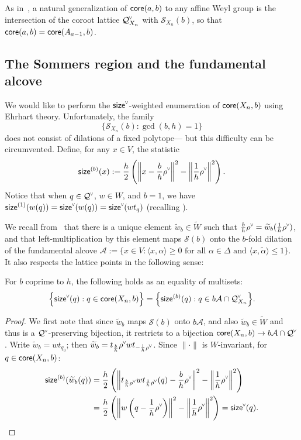 \documentclass[ALCO,published]{cedram}
\newcommand{\chk}[1]{#1^{\normalfont\smash{\scalebox{.5}[.5]{\rotatebox{90}{\textbf{\textless}}}}}}
\newcommand{\wa}{\widetilde{W}}
\newcommand{\Q}{\mathcal{Q}}
\newcommand{\ac}{\mathcal{A}}
\newcommand{\Sommers}{\mathcal{S}}
\newcommand{\core}{{\sf core}}
\newcommand{\waf}{\widetilde{w}}
\newcommand{\wf}{\waf_{\rat}}
\newcommand{\amax}{\tilde{\alpha}}
\newcommand{\size}{{\sf size}}
\newcommand{\sizeb}{\size^{(b)}}
\newcommand{\rat}{b}
\begin{document}
As in~, a natural generalization of $\core(a,b)$ to any affine Weyl group is the intersection of the coroot lattice $\chk{\Q}_{X_n}$ with $\Sommers_{X_n}(b)$, so that $\core(a,b) = \core(A_{a-1},b)$.


\subsection{The Sommers region and the fundamental alcove}

We would like to perform the $\chk{\size}$-weighted enumeration of $\core(X_n,b)$ using Ehrhart theory. Unfortunately, the family \[\{\Sommers_{X_n}(b): \gcd(b,h)=1\}\] does not consist of dilations of a fixed polytope--- but this difficulty can be circumvented.
Define, for any $x\in V$, the statistic
\begin{equation}\sizeb(x):=\frac{h}{2}\left(\left\|x - \frac{b}{h}\chk{\rho}\right\|^2 - \left\|\frac{1}{h}\chk{\rho}\right\|^2 \right). \end{equation}
Notice that when $q\in\chk{\Q}$, $w\in W$, and $b=1$, we have $\size^{(1)}(w(q))=\chk{\size}(w(q)) = \chk{\size}(wt_q)$ (recalling ).

We recall from~\cite[\S 4]{thiel2017strange} that there is a unique element $\wf\in \wa$ such that $\frac{b}{h}\chk{\rho} = \wf(\frac{1}{h}\chk{\rho})$, and that left-multiplication by this element maps $\Sommers(b)$ onto the $b$-fold dilation of the fundamental alcove $\ac:= \{x\in V:\langle x,\alpha\rangle\geq 0\text{ for all }\alpha\in\Delta\text{ and }\langle x,\amax\rangle\leq 1\}$. It also respects the lattice points in the following sense:

\begin{theorem}
\label{thm:size_after_wb}
For $b$ coprime to $h$, the following holds as an equality of multisets:
\[\Big\{\chk{\size}(q) : q \in \core(X_n,b)\Big\} = \Big\{\sizeb(q) : q \in \rat\ac \cap \chk{\Q}_{X_n}\Big\}.\]
\end{theorem}
\begin{proof}
We first note that since $\wf$ maps $\Sommers(b)$ onto $b\ac$, and also $\wf\in\wa$ and thus is a $\chk{\Q}$-preserving bijection, it restricts to a bijection $\core(X_n,b)\to \rat\ac \cap \chk{\Q}$.  Write $\wf = w t_{q_0}$; then $\wf = t_{\frac{b}{h}}\chk{\rho} w t_{-\frac{1}{h}\chk{\rho}}$. Since $\|\cdot\|$ is $W$-invariant, for $q\in \core(X_n,b)$:
\begin{align*}
\sizeb(\wf(q)) &= \frac{h}{2}\left(\left\| t_{\frac{b}{h}\chk{\rho}} w t_{\frac{1}{h}\chk{\rho}} (q) - \frac{b}{h}\chk{\rho}\right\|^2 - \left\|\frac{1}{h}\chk{\rho}\right\|^2 \right) \\
&= \frac{h}{2}\left(\left\|w\left(q - \frac{1}{h}\chk{\rho}\right)\right\|^2 - \left\|\frac{1}{h}\chk{\rho}\right\|^2 \right) = \chk{\size}(q).\qedhere
\end{align*}
\end{proof}
\end{document}
